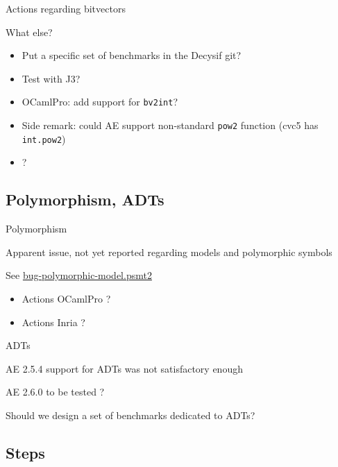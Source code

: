 \documentclass[aspectratio=169]{beamer}
\begin{document}
\begin{frame}{Actions regarding bitvectors}

  What else?

  \begin{itemize}
  \item Put a specific set of benchmarks in the Decysif git?
  \item Test with J3?
  \item OCamlPro: add support for \texttt{bv2int}?
  \item Side remark: could AE support non-standard \texttt{pow2} function (cvc5 has \texttt{int.pow2})
  \item ?
  \end{itemize}

\end{frame}

\subsection{Polymorphism, ADTs}

\begin{frame}{Polymorphism}

  Apparent issue, not yet reported regarding models and polymorphic symbols

  See \url{bug-polymorphic-model.psmt2}

  \begin{itemize}
  \item Actions OCamlPro ?
  \item Actions Inria ?
  \end{itemize}

\end{frame}

\begin{frame}{ADTs}

  AE 2.5.4 support for ADTs was not satisfactory enough

  AE 2.6.0 to be tested ?

  Should we design a set of benchmarks dedicated to ADTs?

\end{frame}

\subsection{Steps}
\end{document}
